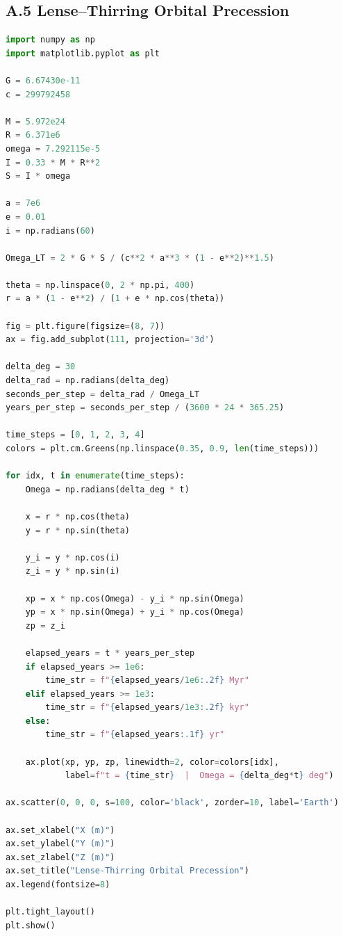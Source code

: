 \documentclass[12pt, a4paper]{article}
\theoremstyle{plain}
\theoremstyle{definition}
\theoremstyle{remark}
\begin{document}
\subsection*{A.5 Lense--Thirring Orbital Precession}

\begin{lstlisting}[language=Python]
import numpy as np
import matplotlib.pyplot as plt

G = 6.67430e-11
c = 299792458

M = 5.972e24
R = 6.371e6
omega = 7.292115e-5
I = 0.33 * M * R**2
S = I * omega

a = 7e6
e = 0.01
i = np.radians(60)

Omega_LT = 2 * G * S / (c**2 * a**3 * (1 - e**2)**1.5)

theta = np.linspace(0, 2 * np.pi, 400)
r = a * (1 - e**2) / (1 + e * np.cos(theta))

fig = plt.figure(figsize=(8, 7))
ax = fig.add_subplot(111, projection='3d')

delta_deg = 30
delta_rad = np.radians(delta_deg)
seconds_per_step = delta_rad / Omega_LT
years_per_step = seconds_per_step / (3600 * 24 * 365.25)

time_steps = [0, 1, 2, 3, 4]
colors = plt.cm.Greens(np.linspace(0.35, 0.9, len(time_steps)))

for idx, t in enumerate(time_steps):
    Omega = np.radians(delta_deg * t)

    x = r * np.cos(theta)
    y = r * np.sin(theta)

    y_i = y * np.cos(i)
    z_i = y * np.sin(i)

    xp = x * np.cos(Omega) - y_i * np.sin(Omega)
    yp = x * np.sin(Omega) + y_i * np.cos(Omega)
    zp = z_i

    elapsed_years = t * years_per_step
    if elapsed_years >= 1e6:
        time_str = f"{elapsed_years/1e6:.2f} Myr"
    elif elapsed_years >= 1e3:
        time_str = f"{elapsed_years/1e3:.2f} kyr"
    else:
        time_str = f"{elapsed_years:.1f} yr"

    ax.plot(xp, yp, zp, linewidth=2, color=colors[idx],
            label=f"t = {time_str}  |  Omega = {delta_deg*t} deg")

ax.scatter(0, 0, 0, s=100, color='black', zorder=10, label='Earth')

ax.set_xlabel("X (m)")
ax.set_ylabel("Y (m)")
ax.set_zlabel("Z (m)")
ax.set_title("Lense-Thirring Orbital Precession")
ax.legend(fontsize=8)

plt.tight_layout()
plt.show()


\end{lstlisting}
\end{document}
